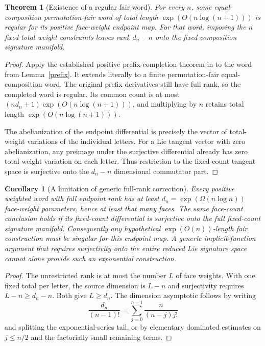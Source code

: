 \documentclass[11pt]{article}
\newtheorem{theorem}{Theorem}
\newtheorem{corollary}{Corollary}
\begin{document}
\begin{theorem}[Existence of a regular fair word]\label{fair}
For every $n$, some equal-composition permutation-fair word of total
length $\exp(O(n\log(n+1)))$ is regular for its positive face-weight
endpoint map.
For that word, imposing the $n$ fixed total-weight constraints leaves
rank $d_n-n$ onto the fixed-composition signature manifold.
\end{theorem}
\begin{proof}
Apply the established positive prefix-completion theorem in
 to the
word from Lemma~\ref{prefix}. It extends literally to a finite
permutation-fair equal-composition word. The original prefix derivatives
still have full rank, so the completed word is regular. Its common count
is at most $(n d_n+1)\exp(O(n\log(n+1)))$, and multiplying by $n$
retains total length $\exp(O(n\log(n+1)))$.

The abelianization of the endpoint differential is precisely the
vector of total-weight variations of the individual letters. For a
Lie tangent vector with zero abelianization, any preimage under the
surjective differential already has zero total-weight variation on
each letter. Thus restriction to the fixed-count tangent space is
surjective onto the $d_n-n$ dimensional commutator part.
\end{proof}

\begin{corollary}[A limitation of generic full-rank correction]
Every positive weighted word with full endpoint rank has at least
$d_n=\exp(\Omega(n\log n))$ face-weight parameters, hence at least
that many faces. The same face-count conclusion holds if its fixed-count
differential is surjective onto the full fixed-count signature manifold.
Consequently any hypothetical $\exp(O(n))$-length fair construction
must be singular for this endpoint map. A generic implicit-function
argument that requires surjectivity onto the entire reduced Lie
signature space cannot alone provide such an exponential construction.
\end{corollary}
\begin{proof}
The unrestricted rank is at most the number $L$ of face weights.
With one fixed total per letter, the source dimension is $L-n$ and
surjectivity requires $L-n\ge d_n-n$. Both give $L\ge d_n$.
The dimension asymptotic follows by writing
\[
 \frac{d_n}{(n-1)!}
   =\sum_{j=0}^{n-1}\frac{n}{(n-j)j!}
\]
and splitting the exponential-series tail, or by elementary dominated
estimates on $j\le n/2$ and the factorially small remaining terms.
\end{proof}
\end{document}
